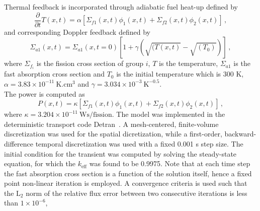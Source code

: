 \documentclass[]{interact}
\theoremstyle{plain}%
\theoremstyle{definition}
\theoremstyle{remark}
\begin{document}
Thermal feedback is incorporated through adiabatic fuel heat-up defined by
\begin{equation}
\frac{\partial}{\partial t}T(x,t) = \alpha[\Sigma_{f1}(x,t)\phi_1(x,t)+\Sigma_{f2}(x,t)\phi_2(x,t)] \, ,
\label{eq:heatup}
\end{equation}
and corresponding Doppler feedback defined by
\begin{equation}
\Sigma_{a1}(x,t) = \Sigma_{a1}(x,t=0)[1+\gamma(\sqrt{(T(x,t)}-\sqrt{(T_0)})] \, ,
\label{eq:doppler}
\end{equation}
where $\Sigma_{f_i}$ is the fission cross section of group $i$, $T$ is the temperature,  $\Sigma_{a1}$ is the fast absorption cross section and  $T_0$ is the initial temperature which is $300 $ K,
$\alpha = 3.83\times 10^{-11}~\text{K}.\text{cm}^3$ and $\gamma = 3.034\times 10^{-3} ~\text{K}^{-0.5}$.\\
The power is computed as
\begin{equation}
P(x,t)=\kappa [\Sigma_{f1}(x,t)\phi_1(x,t)+\Sigma_{f2}(x,t)\phi_2(x,t)] \, ,
\end{equation}
where $\kappa = 3.204\times 10^{-11}~ \text{Ws/fission}$.
The model was implemented in the deterministic transport code Detran~\cite{roberts2014advanced}.  
A mesh-centered, finite-volume discretization was used for the spatial dicretization, while a first-order, backward-difference temporal discretization was used with a fixed 0.001 s step size.  
The initial condition for the transient was computed by solving the steady-state equation, for which the $k_{\text{eff}}$ was found to be 0.9975.
Note that at each time step the fast absorption cross section is a function of the solution itself, hence a fixed point non-linear iteration is employed.
A convergence criteria is used such that the $\text{L}_2$ norm  of the relative flux error between two consecutive iterations is less than $1\times 10^{-6}$,
\end{document}
